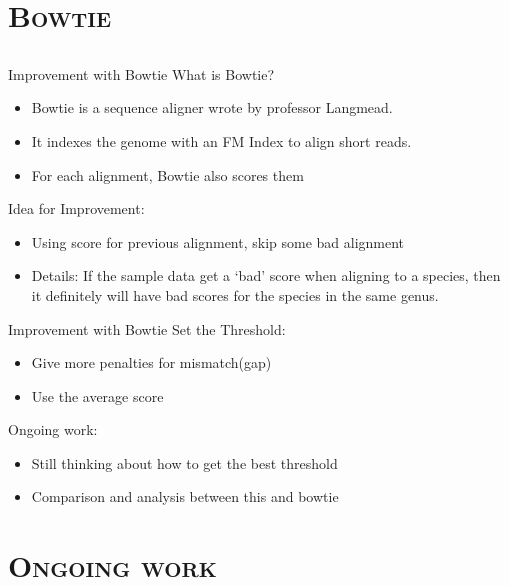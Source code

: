 \documentclass[xcolor=x11names,compress]{beamer}
\renewcommand{\(}{\begin{columns}}
\renewcommand{\)}{\end{columns}}
\newcommand{\<}[1]{\begin{column}{#1}}
\renewcommand{\>}{\end{column}}
\begin{document}
\section{\scshape Bowtie}
\subsection{}
\begin{frame}{Improvement with Bowtie}
What is Bowtie?
\begin{itemize}
	\item Bowtie is a sequence aligner wrote by professor Langmead. 
	\item  It indexes the genome with an FM Index to align short reads.
	\item  For each alignment, Bowtie also scores them
\end{itemize}

Idea for Improvement:
\begin{itemize}
	\item Using score for previous alignment, skip some bad alignment
	
	\item Details: If the sample data get a `bad' score when aligning to a species, then it definitely will have bad scores for the species in the same genus. 
	\end{itemize}
\end{frame}
\begin{frame}{Improvement with Bowtie}
Set the Threshold:
\begin{itemize}
     \item Give more penalties for mismatch(gap)
	\item  Use the average score 
\end{itemize}

Ongoing work:
\begin{itemize}
	\item Still thinking about how to get the best threshold
	\item Comparison and analysis between this and bowtie 
\end{itemize}
\end{frame}

\section{\scshape Ongoing work}
\end{document}
